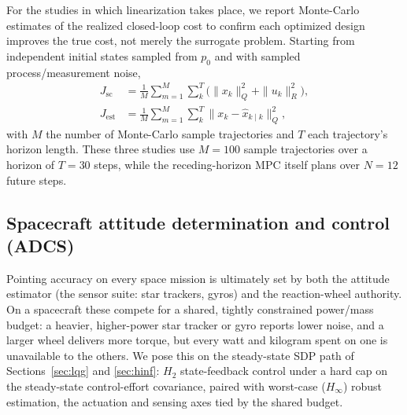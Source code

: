 \documentclass[twocolumn,amsthm]{autart}
\begin{document}
For the studies in which linearization takes place, we report Monte-Carlo estimates of the realized closed-loop cost to confirm each optimized
design improves the true cost, not merely the surrogate problem. Starting from independent initial states sampled from $p_0$ and
with sampled process/measurement noise,
\begin{equation}\label{eq:costsplit}
\begin{aligned}
J_{\mathrm{sc}} &= \frac{1}{M}\sum_{m=1}^M\sum_{k}^T\!\big(\|x_k\|_Q^2+\|u_k\|_R^2\big),\\
J_{\mathrm{est}} &= \frac{1}{M}\sum_{m=1}^M\sum_{k}^T\|x_k-\hat x_{k\mid k}\|_Q^2,
\end{aligned}
\end{equation}
with $M$ the number of Monte-Carlo sample trajectories and $T$ each trajectory's
horizon length. These three studies use $M=100$ sample
trajectories over a horizon of $T=30$ steps, while the receding-horizon
MPC itself plans over $N=12$ future steps.

\subsection{Spacecraft attitude determination and control (ADCS)}
\label{sec:sim:adcs}

Pointing accuracy on every space mission is ultimately set by both the attitude estimator (the sensor suite: star trackers, gyros)
and the reaction-wheel authority. On a spacecraft these compete for a shared,
tightly constrained power/mass budget: a heavier, higher-power star tracker
or gyro reports lower noise, and a larger wheel delivers more torque, but every
watt and kilogram spent on one is unavailable to the others. We pose this on the
steady-state SDP path of Sections~\ref{sec:lqg} and \ref{sec:hinf}: $H_2$
state-feedback control under a hard cap on the steady-state control-effort
covariance, paired with worst-case ($H_\infty$) robust estimation, the
actuation and sensing axes tied by the shared budget.
\end{document}
